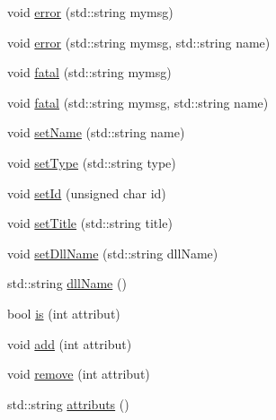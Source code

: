 \begin{DoxyCompactItemize}
\item 
void \hyperlink{classObject_a204a95f57818c0f811933917a30eff45}{error} (std::string mymsg)
\item 
void \hyperlink{classObject_ad7f6c457733082efa2f9ff5f5c8e119a}{error} (std::string mymsg, std::string name)
\item 
void \hyperlink{classObject_aad5a16aac7516ce65bd5ec02ab07fc80}{fatal} (std::string mymsg)
\item 
void \hyperlink{classObject_ae62acd3d09f716220f75f252dc38bc9a}{fatal} (std::string mymsg, std::string name)
\item 
void \hyperlink{classObject_ae30fea75683c2d149b6b6d17c09ecd0c}{setName} (std::string name)
\item 
void \hyperlink{classObject_aae534cc9d982bcb9b99fd505f2e103a5}{setType} (std::string type)
\item 
void \hyperlink{classObject_a398fe08cba594a0ce6891d59fe4f159f}{setId} (unsigned char id)
\item 
void \hyperlink{classObject_a89557dbbad5bcaa02652f5d7fa35d20f}{setTitle} (std::string title)
\item 
void \hyperlink{classObject_a870c5af919958c2136623b2d7816d123}{setDllName} (std::string dllName)
\item 
std::string \hyperlink{classObject_a2e3947f2870094c332d7454117f3ec63}{dllName} ()
\item 
bool \hyperlink{classAttrib_a704f26af560909ad22065083bb7d4c34}{is} (int attribut)
\item 
void \hyperlink{classAttrib_a235f773af19c900264a190b00a3b4ad7}{add} (int attribut)
\item 
void \hyperlink{classAttrib_a7d4ef7e32d93cb287792b87b857e79f3}{remove} (int attribut)
\item 
std::string \hyperlink{classAttrib_aee7bbf16b144887f196e1341b24f8a26}{attributs} ()
\end{DoxyCompactItemize}
